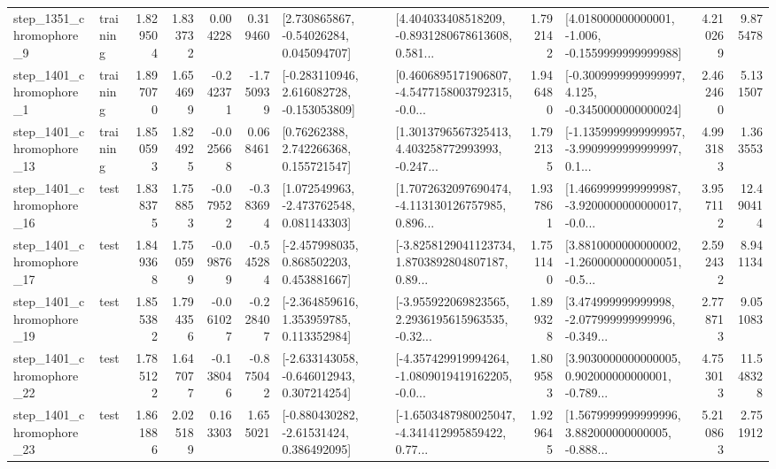\begin{tabular}{llrrrrllrlrr}
  step\_1351\_chromophore\_9 &  training &      1.829504 &    1.833732 &      0.004228 &  0.319460 &     [2.730865867, -0.54026284, 0.045094707] &  [4.404033408518209, -0.8931280678613608, 0.581... &       1.792142 &   [4.018000000000001, -1.006, -0.1559999999999988] &            4.210269 &          9.875478 \\
  step\_1401\_chromophore\_1 &  training &      1.897070 &    1.654699 &     -0.242371 & -1.750939 &   [-0.283110946, 2.616082728, -0.153053809] &  [0.4606895171906807, -4.5477158003792315, -0.0... &       1.946480 &  [-0.3009999999999997, 4.125, -0.3450000000000024] &            2.462460 &          5.131507 \\
 step\_1401\_chromophore\_13 &  training &      1.850593 &    1.824925 &     -0.025668 &  0.068461 &      [0.76262388, 2.742266368, 0.155721547] &  [1.3013796567325413, 4.403258772993993, -0.247... &       1.792135 &  [-1.1359999999999957, -3.9909999999999997, 0.1... &            4.993183 &          1.363553 \\
 step\_1401\_chromophore\_16 &      test &      1.838375 &    1.758853 &     -0.079522 & -0.383694 &    [1.072549963, -2.473762548, 0.081143303] &  [1.7072632097690474, -4.113130126757985, 0.896... &       1.937861 &  [1.4669999999999987, -3.9200000000000017, -0.0... &            3.957112 &         12.490414 \\
 step\_1401\_chromophore\_17 &      test &      1.849368 &    1.750599 &     -0.098769 & -0.545284 &    [-2.457998035, 0.868502203, 0.453881667] &  [-3.8258129041123734, 1.8703892804807187, 0.89... &       1.751140 &  [3.8810000000000002, -1.2600000000000051, -0.5... &            2.592432 &          8.941134 \\
 step\_1401\_chromophore\_19 &      test &      1.855382 &    1.794356 &     -0.061027 & -0.228407 &    [-2.364859616, 1.353959785, 0.113352984] &  [-3.955922069823565, 2.2936195615963535, -0.32... &       1.899328 &  [3.474999999999998, -2.077999999999996, -0.349... &            2.778713 &          9.051083 \\
 step\_1401\_chromophore\_22 &      test &      1.785122 &    1.647077 &     -0.138046 & -0.875042 &   [-2.633143058, -0.646012943, 0.307214254] &  [-4.357429919994264, -1.0809019419162205, -0.0... &       1.809583 &  [3.9030000000000005, 0.902000000000001, -0.789... &            4.753013 &         11.548328 \\
 step\_1401\_chromophore\_23 &      test &      1.861886 &    2.025189 &      0.163303 &  1.655021 &    [-0.880430282, -2.61531424, 0.386492095] &  [-1.6503487980025047, -4.341412995859422, 0.77... &       1.929645 &  [1.5679999999999996, 3.882000000000005, -0.888... &            5.210863 &          2.751912 \\

\end{tabular}
